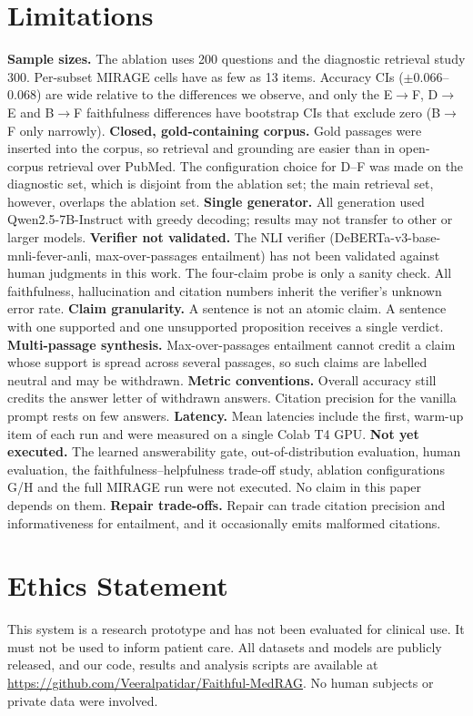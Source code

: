\documentclass[11pt]{article}
\begin{document}
\section*{Limitations}
\textbf{Sample sizes.} The ablation uses 200 questions and the diagnostic retrieval study 300. Per-subset MIRAGE cells have as few as 13 items. Accuracy CIs ($\pm$0.066--0.068) are wide relative to the differences we observe, and only the E$\to$F, D$\to$E and B$\to$F faithfulness differences have bootstrap CIs that exclude zero (B$\to$F only narrowly).
\textbf{Closed, gold-containing corpus.} Gold passages were inserted into the corpus, so retrieval and grounding are easier than in open-corpus retrieval over PubMed. The configuration choice for D--F was made on the diagnostic set, which is disjoint from the ablation set; the main retrieval set, however, overlaps the ablation set.
\textbf{Single generator.} All generation used Qwen2.5-7B-Instruct with greedy decoding; results may not transfer to other or larger models.
\textbf{Verifier not validated.} The NLI verifier (DeBERTa-v3-base-mnli-fever-anli, max-over-passages entailment) has not been validated against human judgments in this work. The four-claim probe is only a sanity check. All faithfulness, hallucination and citation numbers inherit the verifier's unknown error rate.
\textbf{Claim granularity.} A sentence is not an atomic claim. A sentence with one supported and one unsupported proposition receives a single verdict.
\textbf{Multi-passage synthesis.} Max-over-passages entailment cannot credit a claim whose support is spread across several passages, so such claims are labelled neutral and may be withdrawn.
\textbf{Metric conventions.} Overall accuracy still credits the answer letter of withdrawn answers. Citation precision for the vanilla prompt rests on few answers.
\textbf{Latency.} Mean latencies include the first, warm-up item of each run and were measured on a single Colab T4 GPU.
\textbf{Not yet executed.} The learned answerability gate, out-of-distribution evaluation, human evaluation, the faithfulness--helpfulness trade-off study, ablation configurations G/H and the full MIRAGE run were not executed. No claim in this paper depends on them.
\textbf{Repair trade-offs.} Repair can trade citation precision and informativeness for entailment, and it occasionally emits malformed citations.

\section*{Ethics Statement}
This system is a research prototype and has not been evaluated for clinical use. It must not be used to inform patient care. All datasets and models are publicly released, and our code, results and analysis scripts are available at \url{https://github.com/Veeralpatidar/Faithful-MedRAG}. No human subjects or private data were involved.
\end{document}
